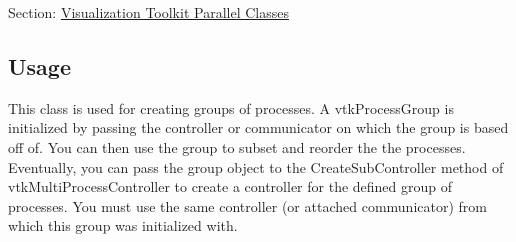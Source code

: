 Section\-: \hyperlink{sec_vtkparallel}{Visualization Toolkit Parallel Classes} \hypertarget{vtkwidgets_vtkxyplotwidget_Usage}{}\subsection{Usage}\label{vtkwidgets_vtkxyplotwidget_Usage}
This class is used for creating groups of processes. A vtk\-Process\-Group is initialized by passing the controller or communicator on which the group is based off of. You can then use the group to subset and reorder the the processes. Eventually, you can pass the group object to the Create\-Sub\-Controller method of vtk\-Multi\-Process\-Controller to create a controller for the defined group of processes. You must use the same controller (or attached communicator) from which this group was initialized with.

